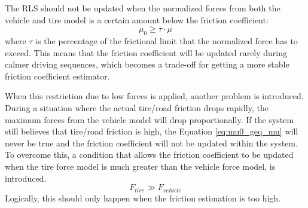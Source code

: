 The RLS should not be updated when the normalized forces from both the vehicle and tire model is a certain amount below the friction coefficient:
\begin{equation}
	\mu_{0} \geq \tau \cdot \mu
	\label{eq:mu0_geq_mu}
\end{equation}
where $ \tau $ is the percentage of the frictional limit that the normalized force has to exceed. This means that the friction coefficient will be updated rarely during calmer driving sequences, which becomes a trade-off for getting a more stable friction coefficient estimator. 

When this restriction due to low forces is applied, another problem is introduced. During a situation where the actual tire/road friction drops rapidly, the maximum forces from the vehicle model will drop proportionally. If the system still believes that tire/road friction is high, the Equation \ref{eq:mu0_geq_mu} will never be true and the friction coefficient will not be updated within the system. To overcome this, a condition that allows the friction coefficient to be updated when the tire force model is much greater than the vehicle force model, is introduced.
\begin{equation}
	F_{tire} \gg F_{vehicle}
\end{equation}
Logically, this should only happen when the friction estimation is too high.